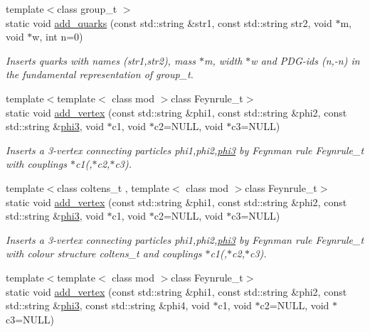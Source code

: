 \begin{DoxyCompactItemize}
{\footnotesize template$<$class group\-\_\-t $>$ }\\static void \hyperlink{a00370_a3c1268dfedbc356a20a5fcd6febe8f3b}{add\-\_\-quarks} (const std\-::string \&str1, const std\-::string str2, void $\ast$m, void $\ast$w, int n=0)
\begin{DoxyCompactList}\small\item\em Inserts quarks with names (str1,str2), mass $\ast$m, width $\ast$w and P\-D\-G-\/ids (n,-\/n) in the fundamental representation of group\-\_\-t. \end{DoxyCompactList}\item 
{\footnotesize template$<$template$<$ class mod $>$class Feynrule\-\_\-t$>$ }\\static void \hyperlink{a00370_abd07d9b401653097ac2bd08865a17d2b}{add\-\_\-vertex} (const std\-::string \&phi1, const std\-::string \&phi2, const std\-::string \&\hyperlink{a00418}{phi3}, void $\ast$c1, void $\ast$c2=N\-U\-L\-L, void $\ast$c3=N\-U\-L\-L)
\begin{DoxyCompactList}\small\item\em Inserts a 3-\/vertex connecting particles phi1,phi2,\hyperlink{a00418}{phi3} by Feynman rule Feynrule\-\_\-t with couplings $\ast$c1(,$\ast$c2,$\ast$c3). \end{DoxyCompactList}\item 
\hypertarget{a00370_aeeca69f18dedd8c9855518cc895a3181}{{\footnotesize template$<$class coltens\-\_\-t , template$<$ class mod $>$class Feynrule\-\_\-t$>$ }\\static void \hyperlink{a00370_aeeca69f18dedd8c9855518cc895a3181}{add\-\_\-vertex} (const std\-::string \&phi1, const std\-::string \&phi2, const std\-::string \&\hyperlink{a00418}{phi3}, void $\ast$c1, void $\ast$c2=N\-U\-L\-L, void $\ast$c3=N\-U\-L\-L)}\label{a00370_aeeca69f18dedd8c9855518cc895a3181}

\begin{DoxyCompactList}\small\item\em Inserts a 3-\/vertex connecting particles phi1,phi2,\hyperlink{a00418}{phi3} by Feynman rule Feynrule\-\_\-t with colour structure coltens\-\_\-t and couplings $\ast$c1(,$\ast$c2,$\ast$c3). \end{DoxyCompactList}\item 
\hypertarget{a00370_ad944c2c9d2c051c4692285b4a6834a4c}{{\footnotesize template$<$template$<$ class mod $>$class Feynrule\-\_\-t$>$ }\\static void \hyperlink{a00370_ad944c2c9d2c051c4692285b4a6834a4c}{add\-\_\-vertex} (const std\-::string \&phi1, const std\-::string \&phi2, const std\-::string \&\hyperlink{a00418}{phi3}, const std\-::string \&phi4, void $\ast$c1, void $\ast$c2=N\-U\-L\-L, void $\ast$c3=N\-U\-L\-L)}\label{a00370_ad944c2c9d2c051c4692285b4a6834a4c}


\end{DoxyCompactItemize}
